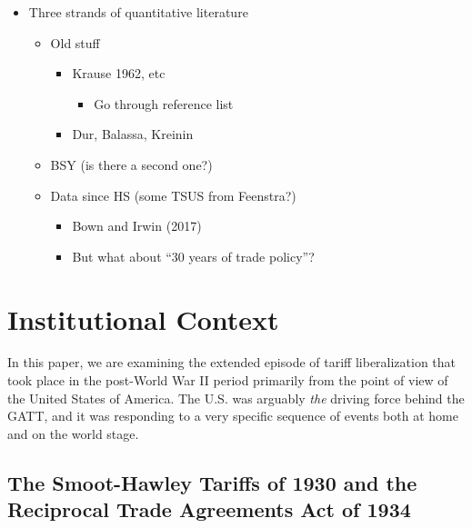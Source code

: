 \documentclass[
  12pt,
]{article}
\providecommand{\tightlist}{%
  \setlength{\itemsep}{0pt}\setlength{\parskip}{0pt}}
\begin{document}
\begin{itemize}
\item
  Three strands of quantitative literature

  \begin{itemize}
  \item
    Old stuff

    \begin{itemize}
    \item
      Krause 1962, etc

      \begin{itemize}
      \tightlist
      \item
        Go through reference list
      \end{itemize}
    \item
      Dur, Balassa, Kreinin
    \end{itemize}
  \item
    BSY (is there a second one?)
  \item
    Data since HS (some TSUS from Feenstra?)

    \begin{itemize}
    \item
      Bown and Irwin (2017)
    \item
      But what about ``30 years of trade policy''?
    \end{itemize}
  \end{itemize}
\end{itemize}

\hypertarget{institutional-context}{%
\section{Institutional Context}\label{institutional-context}}

In this paper, we are examining the extended episode of tariff liberalization that took place in the post-World War II period primarily from the point of view of the United States of America. The U.S. was arguably \emph{the} driving force behind the GATT, and it was responding to a very specific sequence of events both at home and on the world stage.

\hypertarget{the-smoot-hawley-tariffs-of-1930-and-the-reciprocal-trade-agreements-act-of-1934}{%
\subsection{The Smoot-Hawley Tariffs of 1930 and the Reciprocal Trade Agreements Act of 1934}\label{the-smoot-hawley-tariffs-of-1930-and-the-reciprocal-trade-agreements-act-of-1934}}
\end{document}

